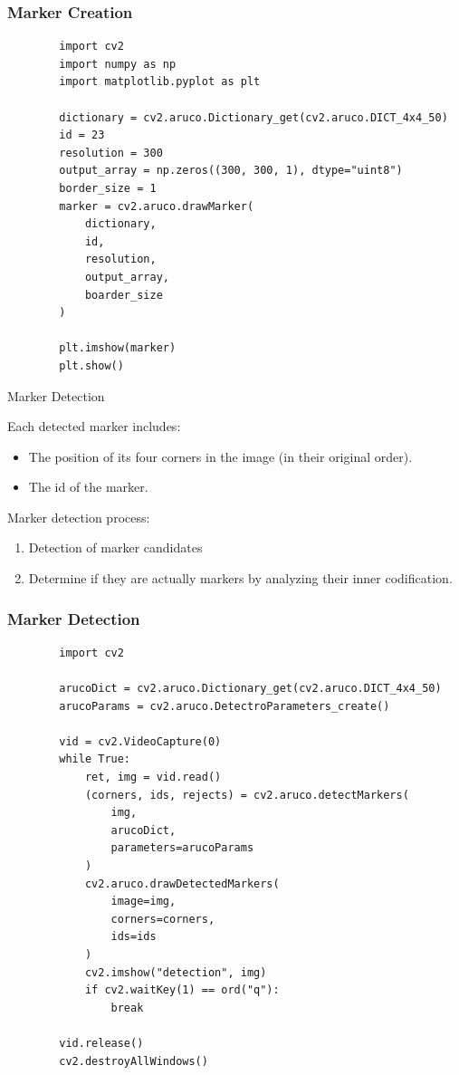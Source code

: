 \documentclass[12pt,letterpaper]{beamer}
\begin{document}
\begin{frame}[fragile]
    \frametitle{Marker Creation}

    {\scriptsize
    \begin{verbatim}
        import cv2
        import numpy as np
        import matplotlib.pyplot as plt

        dictionary = cv2.aruco.Dictionary_get(cv2.aruco.DICT_4x4_50)
        id = 23
        resolution = 300
        output_array = np.zeros((300, 300, 1), dtype="uint8")
        border_size = 1
        marker = cv2.aruco.drawMarker(
            dictionary, 
            id, 
            resolution, 
            output_array, 
            boarder_size
        )
        
        plt.imshow(marker)
        plt.show()
    \end{verbatim}
}
\end{frame}

\begin{frame}{Marker Detection}

    Each detected marker includes:
    {\scriptsize
        \begin{itemize}
            \item The position of its four corners in the image (in their original order).
            \item The id of the marker.
        \end{itemize}
    }
    Marker detection process:
    {\scriptsize
        \begin{enumerate}
            \item Detection of marker candidates
            \item Determine if they are actually markers by analyzing their inner codification.
        \end{enumerate}
    }
\end{frame}

\begin{frame}[fragile]
    \frametitle{Marker Detection}
    \scriptsize
    \begin{verbatim}
        import cv2

        arucoDict = cv2.aruco.Dictionary_get(cv2.aruco.DICT_4x4_50)
        arucoParams = cv2.aruco.DetectroParameters_create()

        vid = cv2.VideoCapture(0)
        while True:
            ret, img = vid.read()
            (corners, ids, rejects) = cv2.aruco.detectMarkers(
                img,
                arucoDict,
                parameters=arucoParams
            )
            cv2.aruco.drawDetectedMarkers(
                image=img,
                corners=corners,
                ids=ids
            )
            cv2.imshow("detection", img)
            if cv2.waitKey(1) == ord("q"):
                break

        vid.release()
        cv2.destroyAllWindows()
    \end{verbatim}
\end{frame}
\end{document}
